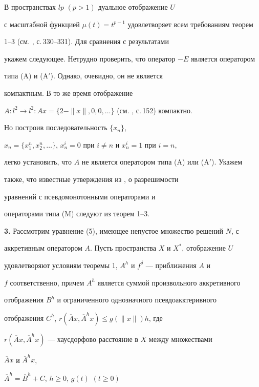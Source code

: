 \begin{note} В пространствах $lp$ $(p>1)$ дуальное отображение $U$ 


с масштабной функцией $\mu(t)=t^{p-1}$ удовлетворяет всем требованиям теорем 


1--3 (см. \cite{Vai}, с.\,330--331). Для сравнения с результатами \cite{Mor} 


укажем следующее. Нетрудно проверить, что оператор $-E$ является оператором 


типа (A) и (A$'$). Однако, очевидно, он не является 


компактным. В то же время отображение 


$A:l^2\to l^2:Ax=\{2-\|x\|,0,0,\dotsc\}$ (см. \cite{Pas}, с.\,152) компактно. 


Но построив последовательность $\{x_n\}$, 


$x_n=\{x^n_1,x^n_2,\dotsc\}$, $x^i_n=0$ при $i\ne n$ и $x^i_n=1$ при $i=n$, 


легко установить, что $A$ не является оператором типа (A) или (A$'$). Укажем 


также, что известные утверждения из \cite{Pas}, \cite{Lio} о разрешимости 


уравнений с псевдомонотонными операторами и 


операторами типа (M) следуют из теорем 1--3. 


\end{note} 


 


{\bf 3.} Рассмотрим уравнение (5), имеющее непустое множество решений $N$, с 


аккретивным оператором $A$. Пусть пространства $X$ и $X^*$, отображение $U$ 


удовлетворяют условиям теоремы 1, $A^h$ и $f^\delta$ --- приближения $A$ и 


$f$ соответственно, причем $A^h$ является суммой произвольного аккретивного 


отображения $B^h$ и ограниченного однозначного псевдоакктеривного 


отображения $C^h$, $r(\overline Ax,\overline A^hx)\le g(\|x\|)h$, где 


$r(\overline Ax,\overline A^hx)$ --- хаусдорфово расстояние в $X$ между множествами 


$\overline Ax$ и $\overline A^hx$,


$\overline A^h=\overline B^h+C$, $h\ge 0$, $g(t)$ $(t\ge 0)$ 


